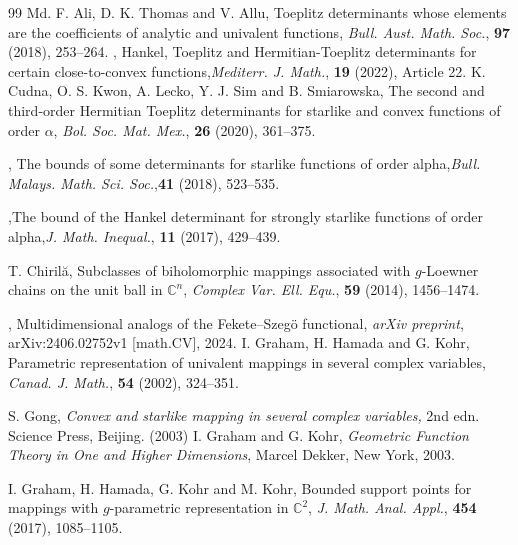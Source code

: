 \documentclass[11pt, reqno]{amsart}
\numberwithin{equation}{section}
\begin{document}
\begin{thebibliography}{99}
 {\sc Md. F. Ali, D. K. Thomas and V. Allu}, Toeplitz determinants whose elements are the coefficients of analytic and univalent functions, \textit{Bull. Aust. Math. Soc.}, \textbf{97} (2018), 253--264.
, Hankel, Toeplitz and Hermitian-Toeplitz determinants for certain close-to-convex functions,\textit{Mediterr. J. Math.}, \textbf{19} (2022), Article 22.
 {\sc K. Cudna, O. S. Kwon, A. Lecko, Y. J. Sim and B. Smiarowska}, The second and third-order Hermitian Toeplitz determinants for starlike and convex functions of order $\alpha$, \textit{Bol. Soc. Mat. Mex.}, \textbf{26} (2020), 361--375.

,
The bounds of some determinants for starlike functions of order alpha,\textit{Bull. Malays. Math. Sci. Soc.},\textbf{41} (2018), 523--535.

,The bound of the Hankel determinant for strongly starlike functions of order alpha,\textit{J. Math. Inequal.}, \textbf{11} (2017), 429--439.

 {\sc T. Chiril\u{a}}, Subclasses of biholomorphic mappings associated with $g$-Loewner chains on the unit ball in $\mathbb{C}^{n}$, \textit{Complex Var. Ell. Equ.}, \textbf{59} (2014), 1456--1474.

, Multidimensional analogs of the Fekete--Szeg\"o functional, \textit{arXiv preprint}, arXiv:2406.02752v1 [math.CV], 2024.
 {\sc I. Graham, H. Hamada and G. Kohr}, Parametric representation of univalent mappings in several complex variables, \textit{Canad. J. Math.}, \textbf{54} (2002), 324--351.

 {\sc S. Gong,}  \textit{Convex and starlike mapping in several complex variables,} 2nd edn. Science Press, Beijing. (2003)
 {\sc I. Graham and G. Kohr}, \textit{Geometric Function Theory in One and Higher Dimensions},
Marcel Dekker, New York, 2003.

 {\sc I. Graham, H. Hamada, G. Kohr and M. Kohr}, Bounded support points for mappings with $g$-parametric representation in $\mathbb{C}^{2}$, \textit{J. Math. Anal. Appl.}, \textbf{454} (2017), 1085--1105.


\end{thebibliography}
\end{document}
